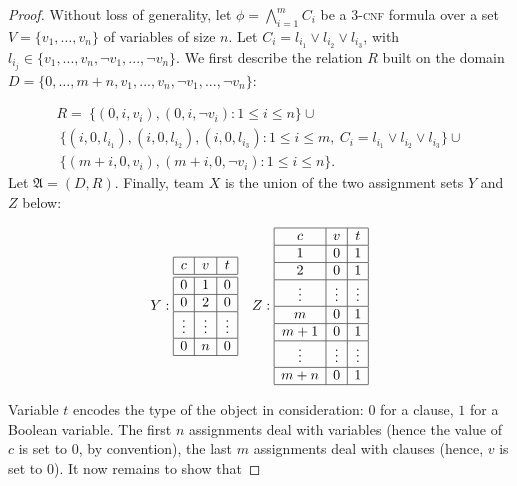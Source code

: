 \documentclass{article}
\theoremstyle{plain}
\theoremstyle{definition}
\newcommand{\mA}{{\mathfrak A}}
\newcommand{\pb}[1]{\textsc{#1}}
\begin{document}
\begin{proof}
Without loss of generality, let $\phi=\bigwedge_{i=1}^m C_i$ be a $3$-\pb{cnf} formula over a set $V=\{v_1,\ldots,v_n\}$ of variables of size $n$. Let $C_i=l_{i_1}\vee l_{i_2}\vee l_{i_3}$, with $l_{i_j}\in\{v_1,...,v_n,\neg v_1, ..., \neg v_n\}$. We first describe the  relation $R$ built on the domain $D=\{0,\ldots, m+n,v_1,...,v_n,\neg v_1, ..., \neg v_n\}$:

\[
\begin{array}{l}
R = 
\ \{(0,i,v_i), (0,i,\neg v_i): 1\leq i \leq n\} \cup \\ 
 \ \{(i,0,l_{i_1}), (i,0,l_{i_2}),  (i,0,l_{i_3}): 1\leq i \leq m, \ C_i=l_{i_1}\vee l_{i_2}\vee l_{i_3}\}  \cup\\
 \  \{(m+i,0,v_i), (m+i,0,\neg v_i): 1\leq i \leq n\}. 
\end{array} 
\]
Let $\mA=(D,R)$.
Finally, team $X$ is the union of the two assignment sets $Y$ and $Z$ below:


 \[
 \begin{array}{cc}
  Y:
  \begin{array}{|c|c|c|}
    \hline  c & v  & t \\ \hline
  \hline  0 & 1  & 0 \\ \hline
  0 & 2  & 0 \\ \hline
 \vdots & \vdots  & \vdots \\ \hline
   0 & n & 0 \\ \hline
  \end{array} 
& 
  Z:
  \begin{array}{|c|c|c|}
    \hline  c & v  & t \\ \hline
    1 & 0  & 1 \\ \hline
     2 & 0  & 1 \\ \hline
    \vdots & \vdots  & \vdots \\ \hline
    m & 0 & 1 \\ \hline
    m+1 & 0 & 1 \\ \hline
      \vdots & \vdots  & \vdots \\ \hline
      m+n & 0 & 1 \\ \hline   
  \end{array} 
  \end{array}
  \]

Variable $t$ encodes the type of the object in consideration: $0$ for a clause, $1$ for a Boolean variable. The first $n$ assignments deal with variables (hence the value of $c$ is set to $0$, by convention), the last $m$ assignments deal with clauses (hence, $v$ is set to $0$). It now remains to show that 


\end{proof}
\end{document}
